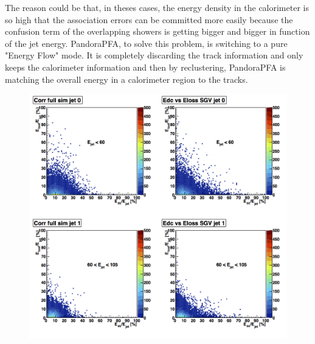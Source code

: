 \documentclass[a4paper,12pt]{article}
\begin{document}
The reason could be that, in theses cases, the energy density in the calorimeter is so high that the association errors can be committed more easily because the confusion term of the overlapping showers is getting bigger and bigger in function of the jet energy. PandoraPFA, to solve this problem, is switching to a pure "Energy Flow" mode. It is completely discarding the track information and only keeps the calorimeter information and then by reclustering, PandoraPFA is matching the overall energy in a calorimeter region to the tracks.

\noindent
\begin{minipage}{\linewidth}
\centering
\begin{minipage}{0.4\linewidth}
\begin{figure}[H]
    \includegraphics[width=\linewidth]{Correlation_1.png} 
\end{figure}
\end{minipage}
      \hspace{0.05\linewidth}
      \begin{minipage}{0.4\linewidth}
\begin{figure}[H]

\end{figure}
\end{minipage}
\end{minipage}
\end{document}
